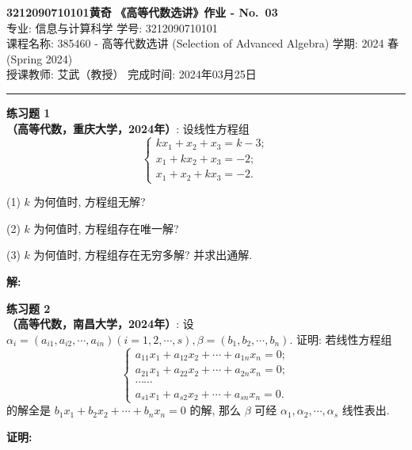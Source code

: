 \documentclass[a4paper, 11pt]{article}
\newenvironment{problem}[2][练习题]
    { \begin{mdframed}[backgroundcolor=gray!5] \textbf{#1 #2} \\}
    {  \end{mdframed}}
\newenvironment{solution}
    {\textbf{解:}}
    {}
\newenvironment{solution2}
    {\textbf{证明:}}
    {}
\begin{document}
\noindent
\large\textbf{3212090710101\quad 黄奇} \hfill \textbf{《高等代数选讲》作业 - No.~\Huge{03}}   \\
专业: 信息与计算科学 \hfill 学号: 3212090710101 \\
\normalsize 课程名称: 385460 - 高等代数选讲 (Selection of Advanced Algebra) \hfill 学期: 2024 春 (Spring 2024)\\
授课教师: 艾武（教授） \hfill 完成时间: 2024年03月25日 \\
\noindent\rule{7in}{1.8pt}

\begin{problem}{1}
\textbf{（高等代数，重庆大学，2024年）}: 设线性方程组
$$
\left\{\begin{array}{l}
k x_1+x_2+x_3=k-3 ; \\
x_1+k x_2+x_3=-2 ; \\
x_1+x_2+k x_3=-2 .
\end{array}\right.
$$

(1) $k$ 为何值时, 方程组无解?

(2) $k$ 为何值时, 方程组存在唯一解?

(3) $k$ 为何值时, 方程组存在无穷多解? 并求出通解.
\end{problem}

\begin{solution}

\end{solution} 


\begin{problem}{2}
\textbf{（高等代数，南昌大学，2024年）}: 设 $\alpha_i=\left(a_{i 1}, a_{i 2}, \cdots, a_{i n}\right)(i=1,2, \cdots, s), \beta=\left(b_1, b_2, \cdots, b_n\right)$. 证明: 若线性方程组
$$
\left\{\begin{array}{c}
a_{11} x_1+a_{12} x_2+\cdots+a_{1 n} x_n=0 ; \\
a_{21} x_1+a_{22} x_2+\cdots+a_{2 n} x_n=0 ; \\
\cdots \cdots \\
a_{s 1} x_1+a_{s 2} x_2+\cdots+a_{s n} x_n=0 .
\end{array}\right.
$$
的解全是 $b_1 x_1+b_2 x_2+\cdots+b_n x_n=0$ 的解, 那么 $\beta$ 可经 $\alpha_1, \alpha_2, \cdots, \alpha_s$ 线性表出.
\end{problem}

\begin{solution2}


\end{solution2} 





\end{document}
